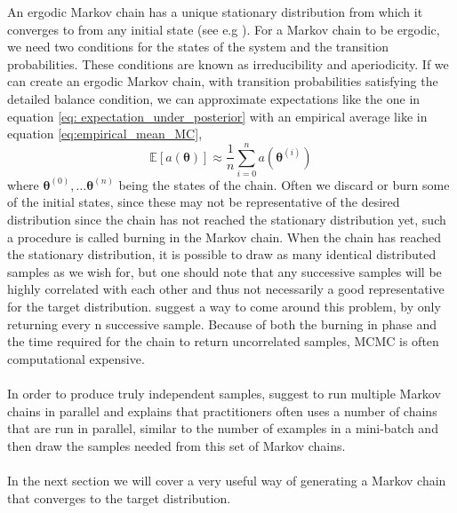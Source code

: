 \noindent
An ergodic Markov chain has a unique stationary distribution from which it converges to from any initial state (see e.g \cite{turkman2019computational}). For a Markov chain to be ergodic, we need two conditions for the states of the system and the transition probabilities. These conditions are known as irreducibility and aperiodicity. If we can create an ergodic Markov chain, with transition probabilities satisfying the detailed balance condition, we can approximate expectations like the one in equation \ref{eq: expectation_under_posterior} with an empirical average like in equation \ref{eq:empirical_mean_MC},
\begin{equation*}
    \mathbb{E}\left[a(\boldsymbol{\theta})\right]\approx \frac{1}{n}\sum_{i=0}^n a(\boldsymbol{\theta}^{(i)})
\end{equation*}
where $\boldsymbol{\theta}^{(0)},\ldots \boldsymbol{\theta}^{(n)}$ being the states of the chain. Often we discard or burn some of the initial states, since these may not be representative of the desired distribution since the chain has not reached the stationary distribution yet, such a procedure is called burning in the Markov chain. When the chain has reached the stationary distribution, it is possible to draw as many identical distributed samples as we wish for, but one should note that any successive samples will be highly correlated with each other and thus not necessarily a good representative for the target distribution. \cite{Goodfellow-et-al-2016} suggest a way to come around this problem, by only returning every n successive sample. Because of both the burning in phase and the time required for the chain to return uncorrelated samples, MCMC is often computational expensive. \\
\\
In order to produce truly independent samples, \cite{Goodfellow-et-al-2016} suggest to run multiple Markov chains in parallel and explains that practitioners often uses a number of chains that are run in parallel, similar to the number of examples in a mini-batch and then draw the samples needed from this set of Markov chains. \\
\\
In the next section we will cover a very useful way of generating a Markov chain that converges to the target distribution. 



